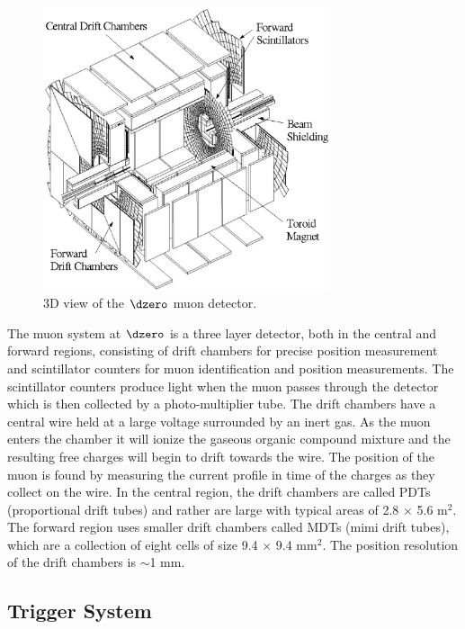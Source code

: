 \begin{figure}[!h!tbp]
\begin{center}
\includegraphics[width=0.75\textwidth]{eps/D0/mudet.eps}
\end{center}
\vspace{-0.1in}
\caption{3D view of the $\dzero$ muon detector.}
\label{MuonDetector}
\end{figure}

The muon system at $\dzero$ is a three layer detector, both in the central and forward regions, consisting of drift chambers for precise position measurement and scintillator counters for muon identification and position measurements. The scintillator counters produce light when the muon passes through the detector which is then collected by a photo-multiplier tube. The drift chambers have a central wire held at a large voltage surrounded by an inert gas. As the muon enters the chamber it will ionize the gaseous organic compound mixture and the resulting free charges will begin to drift towards the wire. The position of the muon is found by measuring the current profile in time of the charges as they collect on the wire. In the central region, the drift chambers are called PDTs (proportional drift tubes) and rather are large with typical areas of 2.8 $\times$ 5.6 m$^{2}$. The forward region uses smaller drift chambers called MDTs (mimi drift tubes), which are a collection of eight cells of size 9.4 $\times$ 9.4 mm$^{2}$. The position resolution of the drift chambers is $\sim$1 mm.

\subsection{Trigger System}
\label{triggersystem}

